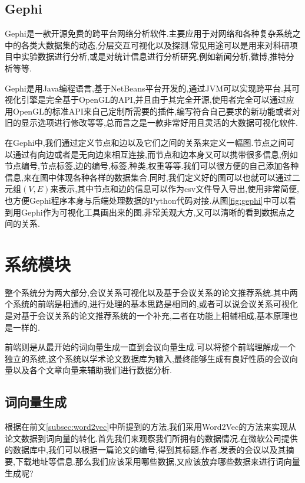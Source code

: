 \subsection{Gephi}

Gephi是一款开源免费的跨平台网络分析软件.主要应用于对网络和各种复杂系统之中的各类大数据集的动态,分层交互可视化以及探测.常见用途可以是用来对科研项目中实验数据进行分析,或是对统计信息进行分析研究,例如新闻分析,微博,推特分析等等.

Gephi是用Java编程语言,基于NetBeans平台开发的,通过JVM可以实现跨平台.其可视化引擎是完全基于OpenGL的API,并且由于其完全开源,使用者完全可以通过应用OpenGL的标准API来自己定制所需要的插件,编写符合自己要求的新功能或者对旧的显示选项进行修改等等,总而言之是一款非常好用且灵活的大数据可视化软件.

在Gephi中,我们通过定义节点和边以及它们之间的关系来定义一幅图.节点之间可以通过有向边或者是无向边来相互连接,而节点和边本身又可以携带很多信息,例如节点编号,节点标签,边的编号,标签,种类,权重等等.我们可以很方便的自己添加各种信息,来在图中体现各种各样的数据集合.同时,我们定义好的图可以也就可以通过二元组$(V,E)$来表示,其中节点和边的信息可以作为csv文件导入导出,使用非常简便,也方便Gephi程序本身与后端处理数据的Python代码对接.从图\ref{fig:gephi}中可以看到用Gephi作为可视化工具画出来的图.非常美观大方,又可以清晰的看到数据点之间的关系.




\section{系统模块}

整个系统分为两大部分,会议关系可视化以及基于会议关系的论文推荐系统.其中两个系统的前端是相通的,进行处理的基本思路是相同的,或者可以说会议关系可视化是对基于会议关系的论文推荐系统的一个补充,二者在功能上相辅相成,基本原理也是一样的.

前端则是从最开始的词向量生成一直到会议向量生成.可以将整个前端理解成一个独立的系统,这个系统以学术论文数据库为输入,最终能够生成有良好性质的会议向量以及各个文章向量来辅助我们进行数据分析.

\subsection{词向量生成}

根据在前文\ref{subsec:word2vec}中所提到的方法,我们采用Word2Vec的方法来实现从论文数据到词向量的转化.首先我们来观察我们所拥有的数据情况.在微软公司提供的数据库中,我们可以根据一篇论文的编号,得到其标题,作者,发表的会议以及其摘要,下载地址等信息.那么我们应该采用哪些数据,又应该放弃哪些数据来进行词向量生成呢?

